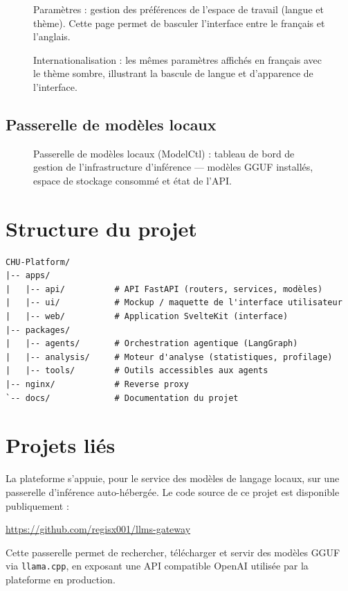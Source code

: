 \begin{figure}[H]
\centering
{}
\caption{Paramètres : gestion des préférences de l'espace de travail (langue et thème). Cette page permet de basculer l'interface entre le français et l'anglais.}
\label{fig:annexe-settings}
\end{figure}

\begin{figure}[H]
\centering
{}
\caption{Internationalisation : les mêmes paramètres affichés en français avec le thème sombre, illustrant la bascule de langue et d'apparence de l'interface.}
\label{fig:annexe-i18n}
\end{figure}

\subsection{Passerelle de modèles locaux}

\begin{figure}[H]
\centering
{}
\caption{Passerelle de modèles locaux (ModelCtl) : tableau de bord de gestion de l'infrastructure d'inférence — modèles GGUF installés, espace de stockage consommé et état de l'API.}
\label{fig:annexe-gateway}
\end{figure}

\section{Structure du projet}

\begin{lstlisting}[caption={Organisation du monorepo}]
CHU-Platform/
|-- apps/
|   |-- api/          # API FastAPI (routers, services, modèles)
|   |-- ui/           # Mockup / maquette de l'interface utilisateur
|   |-- web/          # Application SvelteKit (interface)
|-- packages/
|   |-- agents/       # Orchestration agentique (LangGraph)
|   |-- analysis/     # Moteur d'analyse (statistiques, profilage)
|   |-- tools/        # Outils accessibles aux agents
|-- nginx/            # Reverse proxy
`-- docs/             # Documentation du projet
\end{lstlisting}

\section{Projets liés}

La plateforme s'appuie, pour le service des modèles de langage locaux, sur une passerelle d'inférence auto-hébergée. Le code source de ce projet est disponible publiquement :

\begin{center}
\url{https://github.com/regisx001/llms-gateway}
\end{center}

Cette passerelle permet de rechercher, télécharger et servir des modèles GGUF via \texttt{llama.cpp}, en exposant une API compatible OpenAI utilisée par la plateforme en production.